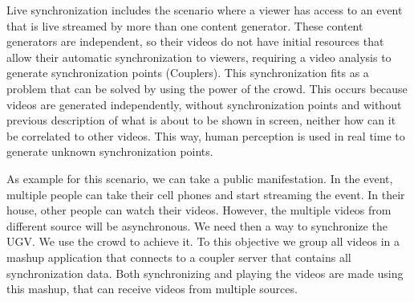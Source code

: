 Live synchronization includes the scenario where a viewer has access to an event that is live streamed by more than one content generator. These content generators are independent, so their videos do not have initial resources that allow their automatic synchronization to viewers, requiring a video analysis to generate synchronization points (Couplers). This synchronization fits as a problem that can be solved by using the power of the crowd. This occurs because videos are generated independently, without synchronization points and without previous description of what is about to be shown in screen, neither how can it be correlated to other videos. This way, human perception is used in real time to generate unknown synchronization points. 

As example for this scenario, we can take a public manifestation. In the event, multiple people can take their cell phones and start streaming the event. In their house, other people can watch their videos. However, the multiple videos from different source will be asynchronous. We need then a way to synchronize the UGV. We use the crowd to achieve it. To this objective we group all videos in a mashup application that connects to a coupler server that contains all synchronization data. Both synchronizing and playing the videos are made using this mashup, that can receive videos from multiple sources.




